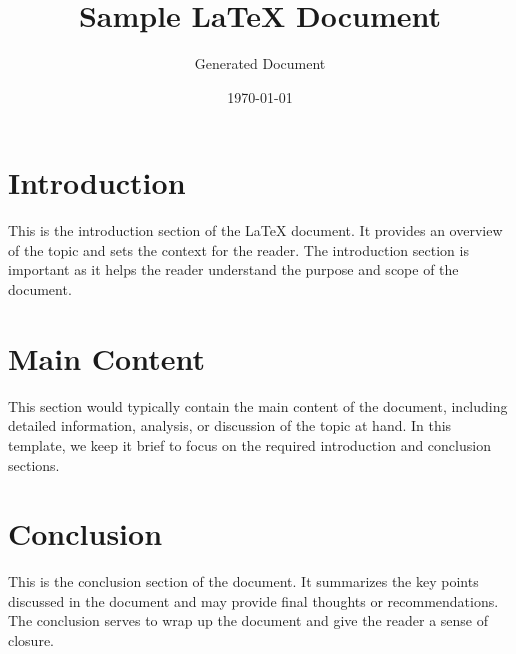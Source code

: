 \documentclass{article}
\title{Sample LaTeX Document}
\author{Generated Document}
\date{\today}
\begin{document}
\maketitle

\section{Introduction}
This is the introduction section of the LaTeX document. It provides an overview of the topic and sets the context for the reader. The introduction section is important as it helps the reader understand the purpose and scope of the document.

\section{Main Content}
This section would typically contain the main content of the document, including detailed information, analysis, or discussion of the topic at hand. In this template, we keep it brief to focus on the required introduction and conclusion sections.

\section{Conclusion}
This is the conclusion section of the document. It summarizes the key points discussed in the document and may provide final thoughts or recommendations. The conclusion serves to wrap up the document and give the reader a sense of closure.
\end{document}
